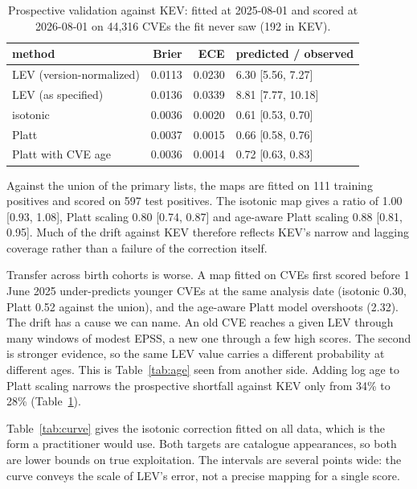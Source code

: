 \begin{table}[t]
\centering\small
\caption{Prospective validation against KEV: fitted at 2025-08-01 and scored
at 2026-08-01 on 44,316 CVEs the fit never saw (192 in KEV).}\label{tab:prosp}
\begin{tabular}{@{}lrrl@{}}
\toprule
method & Brier & ECE & predicted / observed \\
\midrule
LEV (version-normalized) & 0.0113 & 0.0230 & 6.30\x{} [5.56, 7.27] \\
LEV (as specified) & 0.0136 & 0.0339 & 8.81\x{} [7.77, 10.18] \\
isotonic & 0.0036 & 0.0020 & 0.61\x{} [0.53, 0.70] \\
Platt & 0.0037 & 0.0015 & 0.66\x{} [0.58, 0.76] \\
Platt with CVE age & 0.0036 & 0.0014 & 0.72\x{} [0.63, 0.83] \\
\bottomrule
\end{tabular}
\end{table}

Against the union of the primary lists, the maps are fitted on 111 training
positives and scored on 597 test positives. The isotonic map gives a ratio of
1.00 [0.93, 1.08], Platt scaling 0.80 [0.74, 0.87] and age-aware Platt scaling
0.88 [0.81, 0.95]. Much of the drift against KEV therefore reflects KEV's
narrow and lagging coverage rather than a failure of the correction itself.

Transfer across birth cohorts is worse. A map fitted on CVEs first scored
before 1 June 2025 under-predicts younger CVEs at the same analysis date
(isotonic 0.30, Platt 0.52 against the union), and the age-aware Platt model
overshoots (2.32). The drift has a cause we can name. An old CVE reaches a given
LEV through many windows of modest EPSS, a new one through a few high scores.
The second is stronger evidence, so the same LEV value carries a different
probability at different ages. This is Table~\ref{tab:age} seen from another
side. Adding log age to Platt scaling narrows the prospective shortfall
against KEV only from 34\% to 28\% (Table~\ref{tab:prosp}).

Table~\ref{tab:curve} gives the isotonic correction fitted on all data, which
is the form a practitioner would use. Both targets are catalogue appearances,
so both are lower bounds on true exploitation. The intervals are several points
wide: the curve conveys the scale of LEV's error, not a precise mapping for a
single score.

